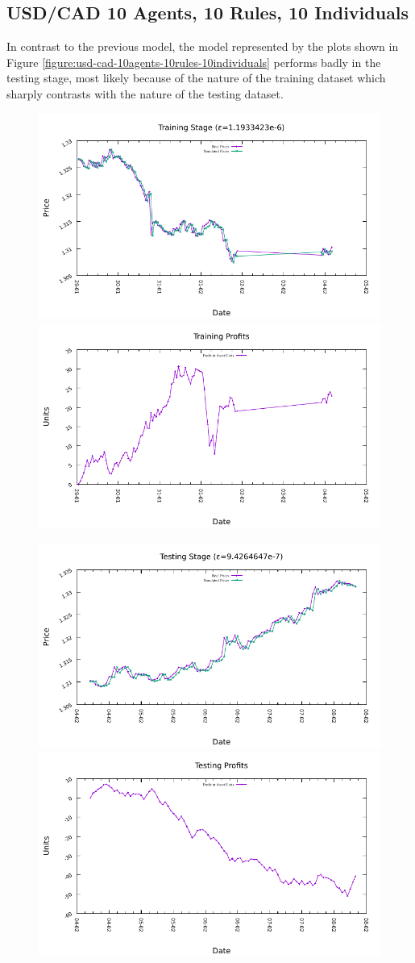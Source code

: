 \newpage

\subsection{USD/CAD 10 Agents, 10 Rules, 10 Individuals}
\label{results:forecast-usd-cad-10agents-10rules-10individuals}

In contrast to the previous model, the model represented by the plots shown in
Figure \ref{figure:usd-cad-10agents-10rules-10individuals} performs badly in the
testing stage, most likely because of the nature of the training dataset which
sharply contrasts with the nature of the testing dataset.

\begin{figure}[htp]
  \centering

  \includegraphics[width=.45\textwidth]{img/plots/usd_cad_h1-10agents-10rules-10ind-100gen_training_fit.pdf}\quad
  \includegraphics[width=.45\textwidth]{img/plots/usd_cad_h1-10agents-10rules-10ind-100gen_training_profits.pdf}

  \medskip

  \includegraphics[width=.45\textwidth]{img/plots/usd_cad_h1-10agents-10rules-10ind-100gen_testing_fit.pdf}\quad
  \includegraphics[width=.45\textwidth]{img/plots/usd_cad_h1-10agents-10rules-10ind-100gen_testing_profits.pdf}


\end{figure}
